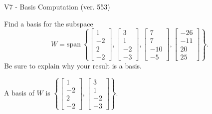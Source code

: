 \begin{exercise}
  \begin{exerciseTitle}V7 - Basis Computation (ver. 553)\end{exerciseTitle}
  \begin{exerciseStatement}
    Find a basis for the subspace 
\[W=\mathrm{span}\ \left\{\left[\begin{array}{r}
1 \\
-2 \\
2 \\
-2
\end{array}\right] , \left[\begin{array}{r}
3 \\
1 \\
-2 \\
-3
\end{array}\right] , \left[\begin{array}{r}
7 \\
7 \\
-10 \\
-5
\end{array}\right] , \left[\begin{array}{r}
-26 \\
-11 \\
20 \\
25
\end{array}\right]\right\}.\]
 Be sure to explain why your result is a basis.


  \end{exerciseStatement}
  \begin{exerciseAnswer}
   A basis of \(W\) is  \(\left\{\left[\begin{array}{r}
1 \\
-2 \\
2 \\
-2
\end{array}\right] , \left[\begin{array}{r}
3 \\
1 \\
-2 \\
-3
\end{array}\right]\right\}\).
  


  \end{exerciseAnswer}
\end{exercise}